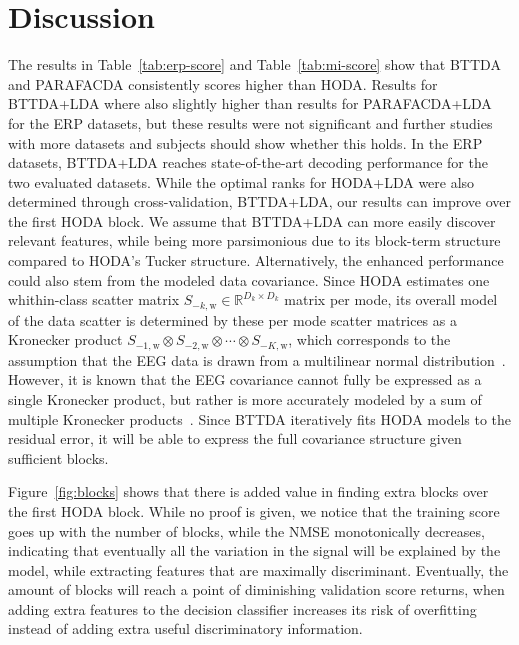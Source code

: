 \documentclass[twocolumn]{article}
\begin{document}
\section{Discussion}
The results in Table~\ref{tab:erp-score} and Table~\ref{tab:mi-score} show
that BTTDA and PARAFACDA consistently scores higher than HODA.
Results for BTTDA+LDA where also slightly higher than results for PARAFACDA+LDA
for the ERP datasets, but these results were not significant and further
studies with more datasets and subjects should show whether this holds.
In the ERP datasets, BTTDA+LDA reaches state-of-the-art decoding performance
for the two evaluated datasets.
While the optimal ranks for HODA+LDA were also determined through
cross-validation, BTTDA+LDA, our results can improve over the first \textsc{HODA} block.
We assume that BTTDA+LDA can more easily discover relevant features, while
being more parsimonious due to its block-term structure compared to HODA's
Tucker structure.
Alternatively, the enhanced performance could also stem from the modeled data
covariance.
Since HODA estimates one whithin-class scatter matrix
$S_{-k,\text{w}}\in\mathbb{R}^{D_k\times D_k}$ matrix per mode, its overall
model of the data scatter is determined by these per mode scatter matrices as a
Kronecker product $S_{-1,\text{w}}\otimes S_{-2,\text{w}}\otimes\cdots\otimes S_{-K,\text{w}}$, which corresponds to the assumption that the EEG data is
drawn from a multilinear normal distribution~\cite{Ohlson2013}.
However, it is known that the EEG covariance cannot fully be expressed as a
single Kronecker product, but rather is more accurately modeled by a sum of
multiple Kronecker products~\cite{Bijma2005}.
Since BTTDA iteratively fits HODA models to the residual error, it will be able
to express the full covariance structure given sufficient blocks.


Figure~\ref{fig:blocks} shows that there is added value in finding extra blocks
over the first \textsc{HODA} block.
While no proof is given, we notice that the training score goes up with the
number of blocks, while the NMSE monotonically decreases, indicating that
eventually all the variation in the signal will be explained by the model, while
extracting features that are maximally discriminant.
Eventually, the amount of blocks will reach a point of diminishing validation
score returns, when adding extra features to the decision classifier increases
its risk of overfitting instead of adding extra useful discriminatory
information.
\end{document}
